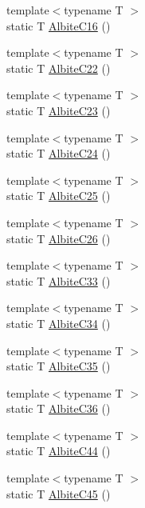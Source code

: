 \begin{DoxyCompactItemize}
\item 
{\footnotesize template$<$typename T $>$ }\\static T \mbox{\hyperlink{namespacempc_1_1data_a128bf8536a395207cf279873aebf0380}{Albite\+C16}} ()
\item 
{\footnotesize template$<$typename T $>$ }\\static T \mbox{\hyperlink{namespacempc_1_1data_a4e07e764265c2f09a8e556fad32c444d}{Albite\+C22}} ()
\item 
{\footnotesize template$<$typename T $>$ }\\static T \mbox{\hyperlink{namespacempc_1_1data_abeca06431a6de76784fe30e5e98670ea}{Albite\+C23}} ()
\item 
{\footnotesize template$<$typename T $>$ }\\static T \mbox{\hyperlink{namespacempc_1_1data_a8148f7f86d37e36281e0d0f2af939552}{Albite\+C24}} ()
\item 
{\footnotesize template$<$typename T $>$ }\\static T \mbox{\hyperlink{namespacempc_1_1data_add0dcc11706dee896b0fba677f4b7ba6}{Albite\+C25}} ()
\item 
{\footnotesize template$<$typename T $>$ }\\static T \mbox{\hyperlink{namespacempc_1_1data_aef8dd5e2750641ef11774255e442766e}{Albite\+C26}} ()
\item 
{\footnotesize template$<$typename T $>$ }\\static T \mbox{\hyperlink{namespacempc_1_1data_a43c94697f4d2bec0934d9d5757596363}{Albite\+C33}} ()
\item 
{\footnotesize template$<$typename T $>$ }\\static T \mbox{\hyperlink{namespacempc_1_1data_a76d15c2d1d52700bef086e696fcc81df}{Albite\+C34}} ()
\item 
{\footnotesize template$<$typename T $>$ }\\static T \mbox{\hyperlink{namespacempc_1_1data_a3ba11d692b5979f1b5257aece93efe8d}{Albite\+C35}} ()
\item 
{\footnotesize template$<$typename T $>$ }\\static T \mbox{\hyperlink{namespacempc_1_1data_ae133523072b6013984ebf05e7029c2c5}{Albite\+C36}} ()
\item 
{\footnotesize template$<$typename T $>$ }\\static T \mbox{\hyperlink{namespacempc_1_1data_acdcfda551a878035a45212e820183b51}{Albite\+C44}} ()
\item 
{\footnotesize template$<$typename T $>$ }\\static T \mbox{\hyperlink{namespacempc_1_1data_a42c2c3b8fc48f4389b0cf13f6fe2d993}{Albite\+C45}} ()

\end{DoxyCompactItemize}
